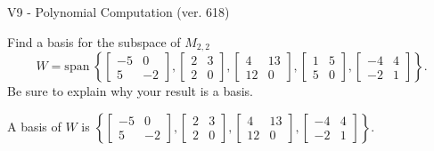 \begin{exercise}
  \begin{exerciseTitle}V9 - Polynomial Computation (ver. 618)\end{exerciseTitle}
  \begin{exerciseStatement}
    Find a basis for the subspace of \(M_{2,2}\) 
\[W=\mathrm{span}\ \left\{\left[\begin{array}{cc}
-5 & 0 \\
5 & -2
\end{array}\right] , \left[\begin{array}{cc}
2 & 3 \\
2 & 0
\end{array}\right] , \left[\begin{array}{cc}
4 & 13 \\
12 & 0
\end{array}\right] , \left[\begin{array}{cc}
1 & 5 \\
5 & 0
\end{array}\right] , \left[\begin{array}{cc}
-4 & 4 \\
-2 & 1
\end{array}\right]\right\}.\]
 Be sure to explain why your result is a basis.


  \end{exerciseStatement}
  \begin{exerciseAnswer}
   A basis of \(W\) is  \(\left\{\left[\begin{array}{cc}
-5 & 0 \\
5 & -2
\end{array}\right] , \left[\begin{array}{cc}
2 & 3 \\
2 & 0
\end{array}\right] , \left[\begin{array}{cc}
4 & 13 \\
12 & 0
\end{array}\right] , \left[\begin{array}{cc}
-4 & 4 \\
-2 & 1
\end{array}\right]\right\}\).
  


  \end{exerciseAnswer}
\end{exercise}